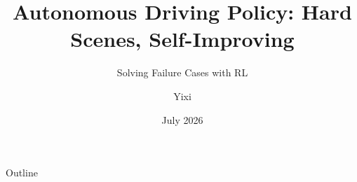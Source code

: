 \documentclass[aspectratio=169,11pt]{beamer}
\title{Autonomous Driving Policy: Hard Scenes, Self-Improving}
\subtitle{\small Solving Failure Cases with RL}
\author{Yixi}
\date{July 2026}
\begin{document}
\begin{frame}
  \titlepage
\end{frame}

\begin{frame}{Outline}
  \tableofcontents
\end{frame}




\end{document}

